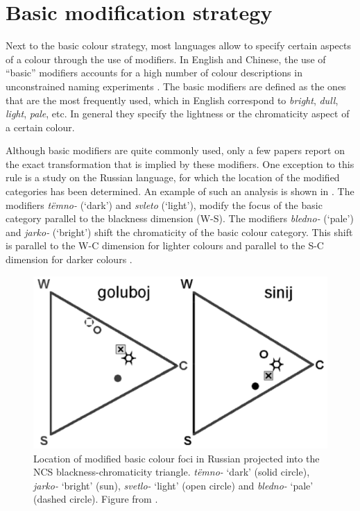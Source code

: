 \chapter{Basic modification strategy}
\label{s:basic-modification-strategy}
\label{s:last-strategy}

Next to the basic colour strategy, most languages allow to
specify certain aspects of a colour through the use of modifiers. In
English and Chinese, the use of ``basic'' modifiers accounts for a high
number of colour descriptions in unconstrained naming experiments
\citep{simpson91sex, lin01unconstrained}. The basic modifiers are
defined as the ones that are the most frequently used, which in
English correspond to \textit{bright}, \textit{dull}, \textit{light}, \textit{pale},
etc. In general they specify the lightness or the chromaticity aspect
of a certain colour.

Although basic modifiers are quite commonly used, only a few
papers report on the exact transformation that is implied by these
modifiers. One exception to this rule is a study on the Russian
language, for which the location of the modified categories has been
determined. An example of such an analysis is shown in . The modifiers \textit{t\"emno-} (`dark') and
\textit{svleto} (`light'), modify the focus of the basic category parallel to the blackness dimension (W-S). The modifiers \textit{bledno-} (`pale') and \textit{jarko-} (`bright') shift the chromaticity of the basic colour
category. This shift is parallel to the W-C dimension for lighter
colours and parallel to the S-C dimension for darker colours
\citep{safuanova07russian}.

\begin{figure}[htpb]
  \centering
  \includegraphics[width=.5\textwidth]{./achromatic/figures/russian-diagram.pdf}
  \caption[Location of modified basic colour foci in Russian]{Location
    of modified basic colour foci in Russian projected into the NCS
    blackness-chromaticity triangle. \textit{t\"emno-} `dark' (solid
    circle), \textit{jarko-} `bright' (sun), \textit{svetlo-} `light'
    (open circle) and \textit{bledno-} `pale' (dashed circle). Figure
    from \cite{paramei05singing}.}
  \label{f:ams-russian-diagram}
\end{figure}


